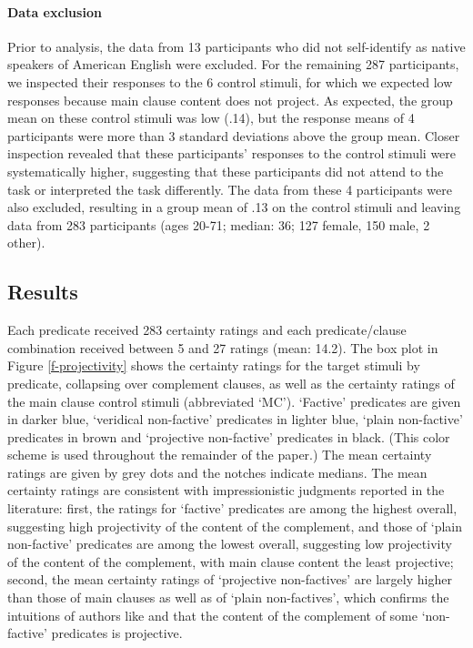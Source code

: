 \documentclass[11pt,fleqn]{article}
\newcommand{\6}{\mbox{$[\hspace*{-.6mm}[$}}
\newcommand{\9}{\mbox{$]\hspace*{-.6mm}]$}}
\newcommand{\citetpos}[1]{\citeauthor{#1}'s (\citeyear{#1})}
\begin{document}
\paragraph{Data exclusion}
Prior to analysis, the data from 13 participants who did not self-identify as native speakers of American English were excluded. For the remaining 287 participants, we inspected their responses to the 6 control stimuli, for which we expected low responses because main clause content does not project. As expected, the group mean on these control stimuli was low (.14), but the response means of 4 participants were more than 3 standard deviations above the group mean. Closer inspection revealed that these participants' responses to the control stimuli were systematically higher, suggesting that these participants did not attend to the task or interpreted the task differently. The data from these 4 participants were also excluded, resulting in a group mean of .13 on the control stimuli and leaving data from 283 participants (ages 20-71; median: 36; 127 female, 150 male, 2 other).

\subsection{Results}

Each predicate received 283 certainty ratings and each predicate/clause combination received between 5 and 27 ratings (mean: 14.2). The box plot in Figure \ref{f-projectivity} shows the certainty ratings for the target stimuli by predicate, collapsing over complement clauses, as well as the certainty ratings of the main clause control stimuli (abbreviated `MC'). `Factive' predicates are given in darker blue, `veridical non-factive' predicates in lighter blue, `plain non-factive' predicates in brown and `projective non-factive' predicates in black. (This color scheme is used throughout the remainder of the paper.) The mean certainty ratings are given by grey dots and the notches indicate medians. 
The mean certainty ratings are consistent with impressionistic judgments reported in the literature: first, the ratings for `factive' predicates are among the highest overall, suggesting high projectivity of the content of the complement, and those of `plain non-factive' predicates are among the lowest overall, suggesting low projectivity of the content of the complement, with main clause content the least projective; second, the mean certainty ratings of `projective non-factives' are largely higher than those of main clauses as well as of `plain non-factives', which confirms the intuitions of authors like \citet{schlenker10,anand-hacquard2014} and \citet{spector-egre2015} that the content of the complement of some `non-factive' predicates is projective.
\end{document}
